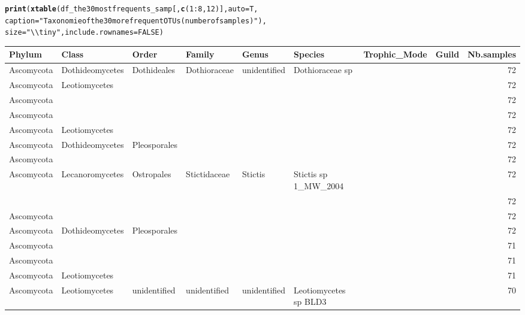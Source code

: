 \documentclass[12pt]{article}\usepackage[]{graphicx}\usepackage[]{color}
\makeatletter
\newcommand{\hlnum}[1]{\textcolor[rgb]{0.686,0.059,0.569}{#1}}%
\newcommand{\hlstr}[1]{\textcolor[rgb]{0.192,0.494,0.8}{#1}}%
\newcommand{\hlopt}[1]{\textcolor[rgb]{0,0,0}{#1}}%
\newcommand{\hlstd}[1]{\textcolor[rgb]{0.345,0.345,0.345}{#1}}%
\newcommand{\hlkwc}[1]{\textcolor[rgb]{0.333,0.667,0.333}{#1}}%
\newcommand{\hlkwd}[1]{\textcolor[rgb]{0.737,0.353,0.396}{\textbf{#1}}}%
\newenvironment{kframe}{%
 \def\at@end@of@kframe{}%
 \ifinner\ifhmode%
  \def\at@end@of@kframe{\end{minipage}}%
  \begin{minipage}{\columnwidth}%
 \fi\fi%
 \def\FrameCommand##1{\hskip\@totalleftmargin \hskip-\fboxsep
 \colorbox{shadecolor}{##1}\hskip-\fboxsep
     \hskip-\linewidth \hskip-\@totalleftmargin \hskip\columnwidth}%
 \MakeFramed {\advance\hsize-\width
   \@totalleftmargin\z@ \linewidth\hsize
   \@setminipage}}%
 {\par\unskip\endMakeFramed%
 \at@end@of@kframe}
\numberwithin{figure}{section}
\makeatother
\begin{document}
\begin{landscape}
\begin{kframe}
\begin{alltt}
\hlkwd{print}\hlstd{(}\hlkwd{xtable}\hlstd{(df_the30mostfrequents_samp[,} \hlkwd{c}\hlstd{(}\hlnum{1}\hlopt{:}\hlnum{8}\hlstd{,} \hlnum{12}\hlstd{)],} \hlkwc{auto} \hlstd{= T,}
      \hlkwc{caption} \hlstd{=} \hlstr{"Taxonomie of the 30 more frequent OTUs (number of samples)"}\hlstd{),}
      \hlkwc{size} \hlstd{=} \hlstr{"\textbackslash{}\textbackslash{}tiny"}\hlstd{,} \hlkwc{include.rownames} \hlstd{=} \hlnum{FALSE}\hlstd{)}
\end{alltt}
\end{kframe}%
\begin{table}[ht]
\centering
\begingroup\tiny
\begin{tabular}{llllllllr}
  \hline
Phylum & Class & Order & Family & Genus & Species & Trophic\_Mode & Guild & Nb.samples \\ 
  \hline
Ascomycota & Dothideomycetes & Dothideales & Dothioraceae & unidentified & Dothioraceae sp &  &  & 72 \\ 
  Ascomycota & Leotiomycetes &  &  &  &  &  &  & 72 \\ 
  Ascomycota &  &  &  &  &  &  &  & 72 \\ 
  Ascomycota &  &  &  &  &  &  &  & 72 \\ 
  Ascomycota & Leotiomycetes &  &  &  &  &  &  & 72 \\ 
  Ascomycota & Dothideomycetes & Pleosporales &  &  &  &  &  & 72 \\ 
  Ascomycota &  &  &  &  &  &  &  & 72 \\ 
  Ascomycota & Lecanoromycetes & Ostropales & Stictidaceae & Stictis & Stictis sp 1\_MW\_2004 &  &  & 72 \\ 
   &  &  &  &  &  &  &  & 72 \\ 
  Ascomycota &  &  &  &  &  &  &  & 72 \\ 
  Ascomycota & Dothideomycetes & Pleosporales &  &  &  &  &  & 72 \\ 
  Ascomycota &  &  &  &  &  &  &  & 71 \\ 
  Ascomycota &  &  &  &  &  &  &  & 71 \\ 
  Ascomycota & Leotiomycetes &  &  &  &  &  &  & 71 \\ 
  Ascomycota & Leotiomycetes & unidentified & unidentified & unidentified & Leotiomycetes sp BLD3 &  &  & 70 \\ 

\end{tabular}
\end{table}
\end{landscape}
\end{document}
